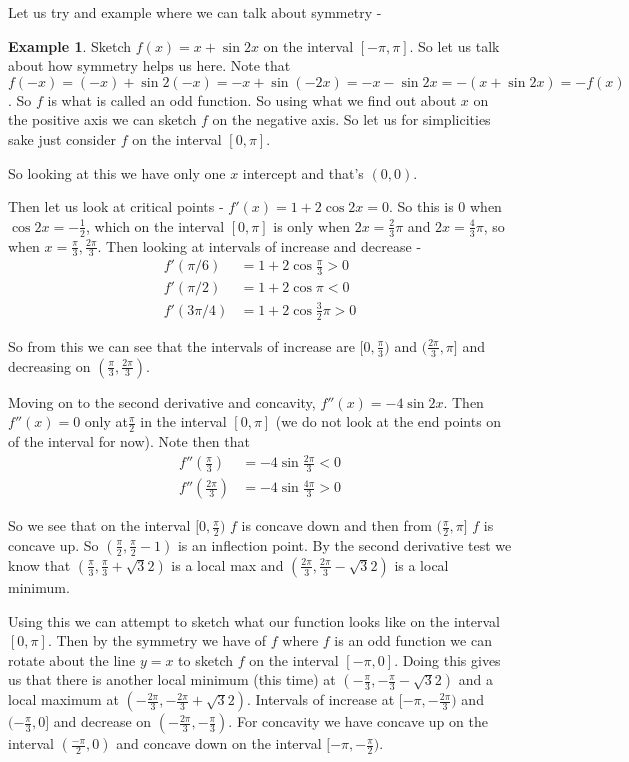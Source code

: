 \documentclass[12pt,reqno]{article}
\theoremstyle{definition}
\newtheorem*{Example}{Example}
\begin{document}
Let us try and example where we can talk about symmetry - 
\begin{Example}
	Sketch $f(x) = x + \sin 2x$ on the interval $[-\pi, \pi]$. So let us talk about how symmetry helps us here. Note that $f(-x) = (-x) + \sin 2(-x) = -x + \sin (-2x) = -x - \sin 2x = - (x + \sin 2x) = - f(x)$. So $f$ is what is called an odd function. So using what we find out about $x$ on the positive axis we can sketch $f$ on the negative axis. So let us for simplicities sake just consider $f$ on the interval $[0, \pi]$. 
	
	So looking at this we have only one $x$ intercept and that's $(0, 0)$. 
	
	Then let us look at critical points - $f'(x) = 1 + 2 \cos 2x = 0$. So this is $0$ when $\cos 2x = - \frac{1}{2}$, which on the interval $[0, \pi]$ is only when $2x = \frac{2}{3}\pi$ and $2x = \frac{4}{3}\pi$, so when $x = \frac{\pi}{3}, \frac{2\pi}{3}$. Then looking at intervals of increase and decrease - 
	\begin{align*}
		f'(\pi/ 6) &= 1 + 2 \cos \frac{\pi}{3} > 0  \\
		f'(\pi/2) &= 1 + 2 \cos \pi < 0 \\
		f'(3\pi/4) &= 1 + 2 \cos \frac{3}{2}\pi > 0 
	\end{align*}
	
	So from this we can see that the intervals of increase are $[0, \frac{\pi}{3})$ and $(\frac{2\pi}{3}, \pi]$ and decreasing on $(\frac{\pi}{3}, \frac{2\pi}{3})$. 
	
	Moving on to the second derivative and concavity, $f''(x) = -4\sin 2x$. Then $f''(x) = 0$ only at$\frac{\pi}{2}$ in the interval $[0, \pi]$ (we do not look at the end points on of the interval for now). Note then that 
	\begin{align*}
		f''(\frac{\pi}{3})  &= -4 \sin \frac{2\pi}{3} < 0 \\	
		f''(\frac{2\pi}{3}) &= -4 \sin \frac{4\pi}{3} > 0
	\end{align*}
	
	So we see that on the interval $[0, \frac{\pi}{2})$ $f$ is concave down and then from $(\frac{\pi}{2}, \pi]$ $f$ is concave up. So $(\frac{\pi}{2}, \frac{\pi}{2} - 1)$ is an inflection point. By the second derivative test we know that $(\frac{\pi}{3}, \frac{\pi}{3} + \sqrt{3}{2})$ is a local max and $(\frac{2\pi}{3}, \frac{2\pi}{3} - \sqrt{3}{2})$ is a local minimum. 
	
	Using this we can attempt to sketch what our function looks like on the interval $[0, \pi]$. Then by the symmetry we have of $f$ where $f$ is an odd function we can rotate about the line $y = x$ to sketch $f$ on the interval $[- \pi, 0]$. Doing this gives us that there is another local minimum (this time) at $(-\frac{\pi}{3}, - \frac{\pi}{3} - \sqrt{3}{2})$ and a local maximum at $(-\frac{2\pi}{3}, -\frac{2\pi}{3} + \sqrt{3}{2})$. Intervals of increase at $[-\pi, -\frac{2\pi}{3})$ and $(-\frac{\pi}{3}, 0]$ and decrease on $(-\frac{2\pi}{3}, -\frac{\pi}{3})$. For concavity we have concave up on the interval $(\frac{-\pi}{2}, 0)$ and concave down on the interval $[-\pi, -\frac{\pi}{2})$. 
	

\end{Example}
\end{document}
